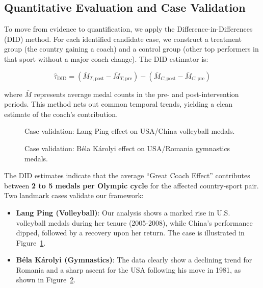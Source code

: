 \documentclass{mcmthesis}
\begin{document}
\subsection{Quantitative Evaluation and Case Validation}

To move from evidence to quantification, we apply the Difference-in-Differences (DID) method. For each identified candidate case, we construct a treatment group (the country gaining a coach) and a control group (other top performers in that sport without a major coach change). The DID estimator is:

\begin{equation}
    \hat{\tau}_{\text{DID}} = (\bar{M}_{T,\text{post}} - \bar{M}_{T,\text{pre}}) - (\bar{M}_{C,\text{post}} - \bar{M}_{C,\text{pre}})
    \label{eq:did}
\end{equation}

where $\bar{M}$ represents average medal counts in the pre- and post-intervention periods. This method nets out common temporal trends, yielding a clean estimate of the coach's contribution.

\begin{figure}[htbp]
    \centering
    \caption{Case validation: Lang Ping effect on USA/China volleyball medals.}
    \label{fig:langping}
\end{figure}

\begin{figure}[htbp]
    \centering
    \caption{Case validation: B\'{e}la K\'{a}rolyi effect on USA/Romania gymnastics medals.}
    \label{fig:karolyi}
\end{figure}

The DID estimates indicate that the average ``Great Coach Effect'' contributes between \textbf{2 to 5 medals per Olympic cycle} for the affected country-sport pair. Two landmark cases validate our framework:

\begin{itemize}
    \item \textbf{Lang Ping (Volleyball)}: Our analysis shows a marked rise in U.S. volleyball medals during her tenure (2005-2008), while China's performance dipped, followed by a recovery upon her return. The case is illustrated in Figure~\ref{fig:langping}.
    \item \textbf{B\'{e}la K\'{a}rolyi (Gymnastics)}: The data clearly show a declining trend for Romania and a sharp ascent for the USA following his move in 1981, as shown in Figure~\ref{fig:karolyi}.
\end{itemize}
\end{document}
